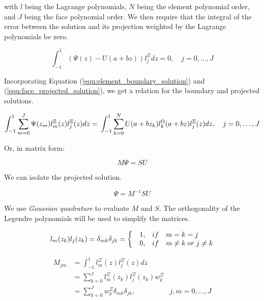 \noindent
with \(l\) being the Lagrange polynomials, \(N\) being the element polynomial order, and \(J\) being
the face polynomial order. We then require that the integral of the error between the solution and
its projection weighted by the Lagrange polynomials be zero. 

\begin{equation} \label{equ:zero_error}
	\int_{-1}^{1} \left( \Psi (z) - U(a + bz) \right) l_j^\Xi dz = 0, \quad j = 0, \ldots,J
\end{equation}

Incorporating Equation (\ref{equ:element_boundary_solution}) and (\ref{equ:face_projected_solution}),
we get a relation for the boundary and projected solutions.

\begin{equation} \label{equ:boundarry_and_projected}
	\int_{-1}^{1} \sum_{m = 0}^{J} \Psi (z_m) l_m^\Xi (z) l_j ^ \Xi(z) dz = \\
	\int_{-1}^{1} \sum_{k = 0}^{N} U(a + b z_k) l_k^\Omega (a + b z) l_j ^ \Xi (z) dz, \\ \quad
	j = 0, \ldots, J
\end{equation}

Or, in matrix form:

\begin{equation}
	M \Psi = S U
\end{equation}

We can isolate the projected solution.

\begin{equation}
	\Psi = M^{-1} S U
\end{equation}

We use \textit{Gaussian quadrature} to evaluate \(M\) and \(S\). The orthogonality of the Legendre
polynomials will be used to simplify the matrices.

\begin{equation} \label{equ:orthogonality_M}
	l_m (z_k) l_j (z_k) = \\
	\delta _{mk} \delta _{j k} = \left \{ \begin{matrix*}[l]
	& 1, & if & m = k = j \\ 
	& 0, & if & m \neq k \; or \; j \neq k
	\end{matrix*}\right.
\end{equation}

\begin{equation} \label{equ:matrix_M}
	\begin{aligned}
		M_{jm} &= \int_{-1}^{1} l_m ^ \Xi (z) l_j ^ \Xi (z) dz \\
		&= \sum_{k = 0}^{J} l_m ^ \Xi (z_k) l_j ^ \Xi (z_k)w_k ^ \Xi \\
		&= \sum_{k = 0}^{J} w_k ^ \Xi \delta_{mk}\delta_{jk}, & j, m = 0, \ldots, J
	\end{aligned}
\end{equation}

